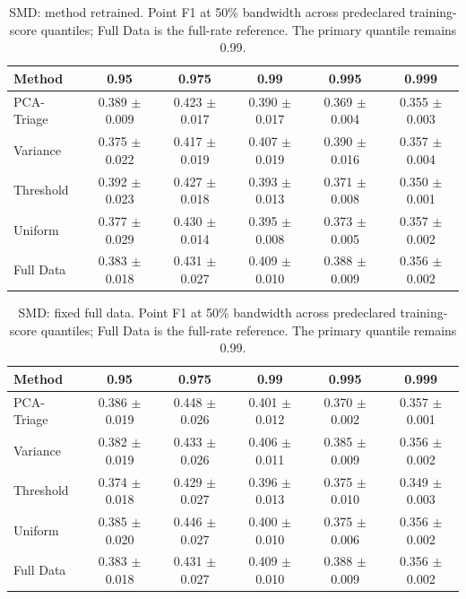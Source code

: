 \begin{table}[ht]
\centering
\small
\caption{SMD: method retrained. Point F1 at 50\% bandwidth across predeclared training-score quantiles; Full Data is the full-rate reference. The primary quantile remains 0.99.}
\begin{tabular}{lccccc}
\toprule
Method & 0.95 & 0.975 & 0.99 & 0.995 & 0.999 \\
\midrule
PCA-Triage & 0.389 $\pm$ 0.009 & 0.423 $\pm$ 0.017 & 0.390 $\pm$ 0.017 & 0.369 $\pm$ 0.004 & 0.355 $\pm$ 0.003 \\
Variance & 0.375 $\pm$ 0.022 & 0.417 $\pm$ 0.019 & 0.407 $\pm$ 0.019 & 0.390 $\pm$ 0.016 & 0.357 $\pm$ 0.004 \\
Threshold & 0.392 $\pm$ 0.023 & 0.427 $\pm$ 0.018 & 0.393 $\pm$ 0.013 & 0.371 $\pm$ 0.008 & 0.350 $\pm$ 0.001 \\
Uniform & 0.377 $\pm$ 0.029 & 0.430 $\pm$ 0.014 & 0.395 $\pm$ 0.008 & 0.373 $\pm$ 0.005 & 0.357 $\pm$ 0.002 \\
Full Data & 0.383 $\pm$ 0.018 & 0.431 $\pm$ 0.027 & 0.409 $\pm$ 0.010 & 0.388 $\pm$ 0.009 & 0.356 $\pm$ 0.002 \\
\bottomrule
\end{tabular}
\end{table}
\begin{table}[ht]
\centering
\small
\caption{SMD: fixed full data. Point F1 at 50\% bandwidth across predeclared training-score quantiles; Full Data is the full-rate reference. The primary quantile remains 0.99.}
\begin{tabular}{lccccc}
\toprule
Method & 0.95 & 0.975 & 0.99 & 0.995 & 0.999 \\
\midrule
PCA-Triage & 0.386 $\pm$ 0.019 & 0.448 $\pm$ 0.026 & 0.401 $\pm$ 0.012 & 0.370 $\pm$ 0.002 & 0.357 $\pm$ 0.001 \\
Variance & 0.382 $\pm$ 0.019 & 0.433 $\pm$ 0.026 & 0.406 $\pm$ 0.011 & 0.385 $\pm$ 0.009 & 0.356 $\pm$ 0.002 \\
Threshold & 0.374 $\pm$ 0.018 & 0.429 $\pm$ 0.027 & 0.396 $\pm$ 0.013 & 0.375 $\pm$ 0.010 & 0.349 $\pm$ 0.003 \\
Uniform & 0.385 $\pm$ 0.020 & 0.446 $\pm$ 0.027 & 0.400 $\pm$ 0.010 & 0.375 $\pm$ 0.006 & 0.356 $\pm$ 0.002 \\
Full Data & 0.383 $\pm$ 0.018 & 0.431 $\pm$ 0.027 & 0.409 $\pm$ 0.010 & 0.388 $\pm$ 0.009 & 0.356 $\pm$ 0.002 \\
\bottomrule
\end{tabular}
\end{table}
